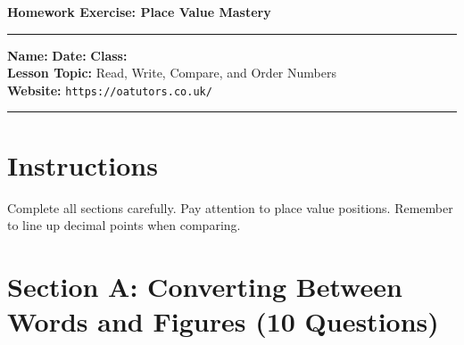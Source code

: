 \documentclass{article}
\begin{document}
\onehalfspacing


\begin{center}
\textbf{\Large Homework Exercise: Place Value Mastery}
\vspace{0.2cm}
\end{center}

\hrule
\vspace{0.1cm}

\textbf{Name:} \underline{\hspace{4cm}} \quad \textbf{Date:} \underline{\hspace{3cm}} \quad \textbf{Class:} \underline{\hspace{2cm}} \\
\textbf{Lesson Topic:} Read, Write, Compare, and Order Numbers \\
\textbf{Website:} \texttt{https://oatutors.co.uk/}

\vspace{0.2cm}
\hrule
\vspace{0.3cm}

\section*{Instructions}
Complete all sections carefully. Pay attention to place value positions. Remember to line up decimal points when comparing.

\section{Section A: Converting Between Words and Figures (10 Questions)}
\end{document}
